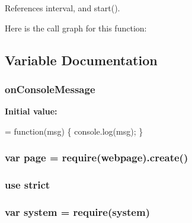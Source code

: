 References interval, and start().



Here is the call graph for this function\+:




\subsection{Variable Documentation}
\subsubsection[{\texorpdfstring{on\+Console\+Message}{onConsoleMessage}}]{ on\+Console\+Message}\hypertarget{run-jasmine_8js_a87e6a5ff0ebb4d272a04b52dd70224c6}{}\label{run-jasmine_8js_a87e6a5ff0ebb4d272a04b52dd70224c6}
{\bfseries Initial value\+:}
\begin{DoxyCode}
= \textcolor{keyword}{function}(msg) \{
    console.log(msg);
\}
\end{DoxyCode}
\subsubsection[{\texorpdfstring{page}{page}}]{\setlength{\rightskip}{0pt plus 5cm}var page = require(\textquotesingle{}webpage\textquotesingle{}).create()}\hypertarget{run-jasmine_8js_a85d8b1b97106b359e1c9ee119ebe5832}{}\label{run-jasmine_8js_a85d8b1b97106b359e1c9ee119ebe5832}
\subsubsection[{\texorpdfstring{strict}{strict}}]{\setlength{\rightskip}{0pt plus 5cm}use strict}\hypertarget{run-jasmine_8js_ae2475e10618961c050dcba04e8c42331}{}\label{run-jasmine_8js_ae2475e10618961c050dcba04e8c42331}
\subsubsection[{\texorpdfstring{system}{system}}]{\setlength{\rightskip}{0pt plus 5cm}var system = require(\textquotesingle{}system\textquotesingle{})}\hypertarget{run-jasmine_8js_acdb77dc97eb44e91baaadd41d9d078fc}{}\label{run-jasmine_8js_acdb77dc97eb44e91baaadd41d9d078fc}
